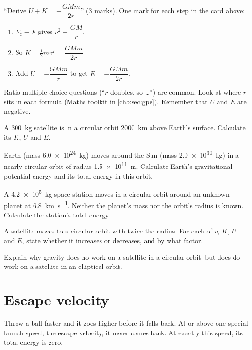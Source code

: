 \begin{examtip}
``Derive $U + K = -\dfrac{GMm}{2r}$'' (3 marks). One mark for each step in the
card above:
\begin{enumerate}
  \item $F_\mathrm{c} = F$ gives $v^2 = \dfrac{GM}{r}$.
  \item So $K = \tfrac{1}{2}mv^2 = \dfrac{GMm}{2r}$.
  \item Add $U = -\dfrac{GMm}{r}$ to get $E = -\dfrac{GMm}{2r}$.
\end{enumerate}
Ratio multiple-choice questions (``$r$ doubles, so \ldots'') are common. Look at
where $r$ sits in each formula (Maths toolkit in \cref{ch5:sec:gpe}). Remember
that $U$ and $E$ are negative.
\end{examtip}

\begin{quickcheck}
  \item A \qty{300}{kg} satellite is in a circular orbit \qty{2000}{km} above
        Earth's surface. Calculate its $K$, $U$ and $E$.
  \item Earth (mass \qty{6.0e24}{kg}) moves around the Sun (mass
        \qty{2.0e30}{kg}) in a nearly circular orbit of radius \qty{1.5e11}{m}.
        Calculate Earth's gravitational potential energy and its total
        energy in this orbit.\label{ch5:qc:sun}
  \item A \qty{4.2e5}{kg} space station moves in a circular orbit around an
        unknown planet at \qty{6.8}{km.s^{-1}}. Neither the planet's mass nor
        the orbit's radius is known. Calculate the station's total
        energy.\label{ch5:qc:station}
  \item A satellite moves to a circular orbit with twice the radius. For each of
        $v$, $K$, $U$ and $E$, state whether it increases or decreases, and by
        what factor.
  \item Explain why gravity does no work on a satellite in a circular orbit, but
        does do work on a satellite in an elliptical orbit.
\end{quickcheck}

\section{Escape velocity}\label{ch5:sec:escape}

\begin{bigidea}
Throw a ball faster and it goes higher before it falls back. At or above one
special launch speed, the escape velocity, it never comes back. At exactly this
speed, its total energy is zero.
\end{bigidea}


